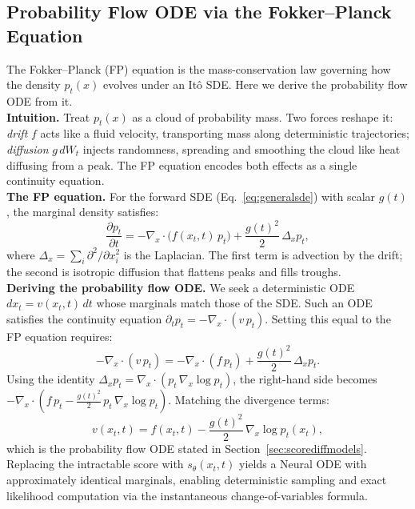 \subsection{Probability Flow ODE via the Fokker--Planck Equation}
\label{app:subsec:fp_ode}

The Fokker--Planck (FP) equation is the mass-conservation law governing how the
density $p_t(x)$ evolves under an It\^{o} SDE. Here we derive the probability
flow ODE from it.\\

\textbf{Intuition.} Treat $p_t(x)$ as a cloud of probability mass. Two forces
reshape it: \textit{drift} $f$ acts like a fluid velocity, transporting mass
along deterministic trajectories; \textit{diffusion} $g\,dW_t$ injects
randomness, spreading and smoothing the cloud like heat diffusing from a peak.
The FP equation encodes both effects as a single continuity equation.\\

\textbf{The FP equation.} For the forward SDE (Eq.~\ref{eq:generalsde}) with
scalar $g(t)$, the marginal density satisfies:
\begin{equation}
    \label{eq:fokker_planck}
    \frac{\partial p_t}{\partial t}
    = -\nabla_x \cdot \bigl(f(x_t,t)\,p_t\bigr)
    + \frac{g(t)^2}{2}\,\Delta_x p_t,
\end{equation}
where $\Delta_x = \sum_i \partial^2/\partial x_i^2$ is the Laplacian. The first
term is advection by the drift; the second is isotropic diffusion that flattens
peaks and fills troughs.\\

\textbf{Deriving the probability flow ODE.} We seek a deterministic ODE
$dx_t = v(x_t,t)\,dt$ whose marginals match those of the SDE. Such an ODE
satisfies the continuity equation $\partial_t p_t = -\nabla_x\cdot(v\,p_t)$.
Setting this equal to the FP equation requires:
\[
    -\nabla_x\cdot(v\,p_t)
    = -\nabla_x\cdot(f\,p_t) + \frac{g(t)^2}{2}\,\Delta_x p_t.
\]
Using the identity $\Delta_x p_t = \nabla_x\cdot(p_t\,\nabla_x\log p_t)$,
the right-hand side becomes $-\nabla_x\cdot\!\left(f\,p_t -
\frac{g(t)^2}{2}\,p_t\,\nabla_x\log p_t\right)$. Matching the divergence terms:
\begin{equation}
    \label{eq:pf_ode_derived}
    v(x_t,t) = f(x_t,t) - \frac{g(t)^2}{2}\,\nabla_x\log p_t(x_t),
\end{equation}
which is the probability flow ODE stated in Section~\ref{sec:scorediffmodels}.
Replacing the intractable score with $s_\theta(x_t,t)$ yields a Neural ODE
with approximately identical marginals, enabling deterministic sampling and
exact likelihood computation via the instantaneous change-of-variables formula.

